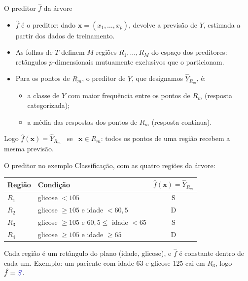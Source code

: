 \documentclass[aspectratio=169]{beamer}
\newcommand{\cS}{\textcolor{blue!70!black}{S}} %
\newcommand{\cD}{\textcolor{red!70!black}{D}}  %
\begin{document}
\begin{frame}{O preditor $\hat f$ da árvore}
\begin{itemize}
  \item $\hat f$ é o \alert{preditor}: dado $\mathbf x=(x_1,\dots,x_p)$, devolve a previsão de $Y$, estimada a partir dos dados de treinamento.
  \item As folhas de $T$ definem $M$ regiões $R_1,\dots,R_M$ do espaço dos preditores: \alert{retângulos $p$-dimensionais} mutuamente exclusivos que o particionam.
  \item Para os pontos de $R_m$, o preditor de $Y$, que designamos $\hat Y_{R_m}$, é:
  \begin{itemize}
    \item a classe de $Y$ com \alert{maior frequência} entre os pontos de $R_m$ (resposta categorizada);
    \item a \alert{média} das respostas dos pontos de $R_m$ (resposta contínua).
  \end{itemize}
\end{itemize}
\begin{block}{Logo}
$\hat f(\mathbf x)=\hat Y_{R_m}$ \ se \ $\mathbf x\in R_m$: todos os pontos de uma região recebem a \alert{mesma} previsão.
\end{block}
\end{frame}

\begin{frame}{O preditor no exemplo}
Classificação, com as quatro regiões da árvore:

\vspace{8pt}
\centering
\begin{tabular}{@{}llc@{}}
\toprule
\textbf{Região} & \textbf{Condição} & $\hat f(\mathbf x)=\hat Y_{R_m}$\\
\midrule
$R_1$ & glicose $<105$ & \cS\\
$R_2$ & glicose $\ge105$ e idade $<60{,}5$ & \cD\\
$R_3$ & glicose $\ge105$ e $60{,}5\le$ idade $<65$ & \cS\\
$R_4$ & glicose $\ge105$ e idade $\ge65$ & \cD\\
\bottomrule
\end{tabular}

\vspace{10pt}
\raggedright
Cada região é um retângulo do plano (idade, glicose), e $\hat f$ é \alert{constante} dentro de cada um. Exemplo: um paciente com idade $63$ e glicose $125$ cai em $R_3$, logo $\hat f=\cS$.
\end{frame}
\end{document}
